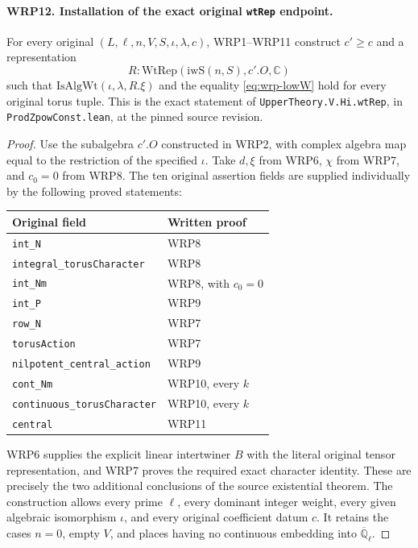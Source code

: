 \documentclass[11pt,a4paper]{article}
\numberwithin{equation}{section}
\theoremstyle{remark}\newtheorem{remark}[theorem]{Remark}
\begin{document}
\paragraph{WRP12. Installation of the exact original \texttt{wt\allowbreak Rep} endpoint.}
\label{claim:WRP12}
For every original $(L,\ell,\allowbreak{} n,\allowbreak{} V,\allowbreak{} S,\iota,\lambda,\allowbreak{} c)$,
WRP1--WRP11 construct $c'\geq c$ and a representation
\[
                  R:\mathrm{WtRep}(\mathrm{iwS}(n,\allowbreak{} S),\allowbreak{} c'.O,\mathbb C)
\]
such that $\mathrm{IsAlgWt}(\iota,\lambda,\allowbreak{} R.\xi)$ and
the equality \eqref{eq:wrp-lowW} hold for every original
torus tuple.  This is the exact statement of
\texttt{Upper\allowbreak Theory.\allowbreak V.\allowbreak Hi.\allowbreak wt\allowbreak Rep}, in
\texttt{Prod\allowbreak Zpow\allowbreak Const.\allowbreak lean}, at the pinned source revision.
\begin{proof}
Use the subalgebra $c'.O$ constructed in WRP2, with
complex algebra map equal to the restriction of the
specified $\iota$.  Take $d,\xi$ from WRP6,
$\chi$ from WRP7, and $c_0=0$ from WRP8.  The ten
original assertion fields are supplied individually
by the following proved statements:
\begin{center}
\begin{tabular}{ll}
Original field & Written proof \\
\hline
\texttt{int\_\allowbreak N} & WRP8 \\
\texttt{integral\_\allowbreak torus\allowbreak Character} & WRP8 \\
\texttt{int\_\allowbreak Nm} & WRP8, with $c_0=0$ \\
\texttt{int\_\allowbreak P} & WRP9 \\
\texttt{row\_\allowbreak N} & WRP7 \\
\texttt{torus\allowbreak Action} & WRP7 \\
\texttt{nilpotent\_\allowbreak central\_\allowbreak action} & WRP9 \\
\texttt{cont\_\allowbreak Nm} & WRP10, every $k$ \\
\texttt{continuous\_\allowbreak torus\allowbreak Character} & WRP10, every $k$ \\
\texttt{central} & WRP11
\end{tabular}
\end{center}
WRP6 supplies the explicit linear intertwiner $B$ with
the literal original tensor representation, and WRP7
proves the required exact character identity.  These
are precisely the two additional conclusions of
the source existential theorem.  The construction
allows every prime $\ell$, every dominant integer
weight, every given algebraic isomorphism $\iota$,
and every original coefficient datum $c$.  It retains
the cases $n=0$, empty $V$, and places having no
continuous embedding into $\overline{\mathbb Q}_\ell$.
\end{proof}
\end{document}
